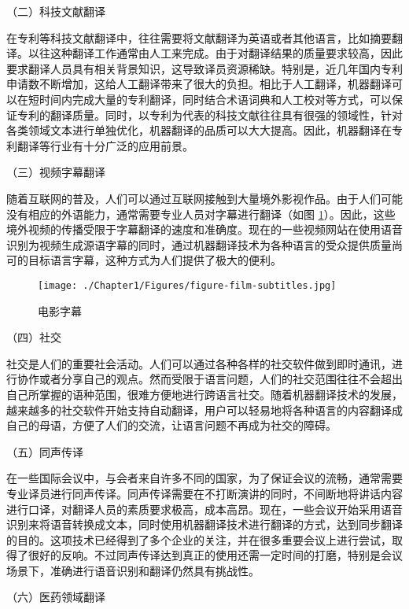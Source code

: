 \parinterval （二）科技文献翻译

\parinterval 在专利等科技文献翻译中，往往需要将文献翻译为英语或者其他语言，比如摘要翻译。以往这种翻译工作通常由人工来完成。由于对翻译结果的质量要求较高，因此要求翻译人员具有相关背景知识，这导致译员资源稀缺。特别是，近几年国内专利申请数不断增加，这给人工翻译带来了很大的负担。相比于人工翻译，机器翻译可以在短时间内完成大量的专利翻译，同时结合术语词典和人工校对等方式，可以保证专利的翻译质量。同时，以专利为代表的科技文献往往具有很强的领域性，针对各类领域文本进行单独优化，机器翻译的品质可以大大提高。因此，机器翻译在专利翻译等行业有十分广泛的应用前景。

\parinterval （三）视频字幕翻译

\parinterval 随着互联网的普及，人们可以通过互联网接触到大量境外影视作品。由于人们可能没有相应的外语能力，通常需要专业人员对字幕进行翻译（如图
\ref{fig:1-13}）。因此，这些境外视频的传播受限于字幕翻译的速度和准确度。现在的一些视频网站在使用语音识别为视频生成源语字幕的同时，通过机器翻译技术为各种语言的受众提供质量尚可的目标语言字幕，这种方式为人们提供了极大的便利。

\begin{figure}[htp]
    \centering
\texttt{[image: ./Chapter1/Figures/figure-film-subtitles.jpg]}
    \caption{电影字幕}
    \label{fig:1-13}
\end{figure}

\parinterval （四）社交

\parinterval 社交是人们的重要社会活动。人们可以通过各种各样的社交软件做到即时通讯，进行协作或者分享自己的观点。然而受限于语言问题，人们的社交范围往往不会超出自己所掌握的语种范围，很难方便地进行跨语言社交。随着机器翻译技术的发展，越来越多的社交软件开始支持自动翻译，用户可以轻易地将各种语言的内容翻译成自己的母语，方便了人们的交流，让语言问题不再成为社交的障碍。

\parinterval （五）同声传译

\parinterval 在一些国际会议中，与会者来自许多不同的国家，为了保证会议的流畅，通常需要专业译员进行同声传译。同声传译需要在不打断演讲的同时，不间断地将讲话内容进行口译，对翻译人员的素质要求极高，成本高昂。现在，一些会议开始采用语音识别来将语音转换成文本，同时使用机器翻译技术进行翻译的方式，达到同步翻译的目的。这项技术已经得到了多个企业的关注，并在很多重要会议上进行尝试，取得了很好的反响。不过同声传译达到真正的使用还需一定时间的打磨，特别是会议场景下，准确进行语音识别和翻译仍然具有挑战性。

\parinterval （六）医药领域翻译

